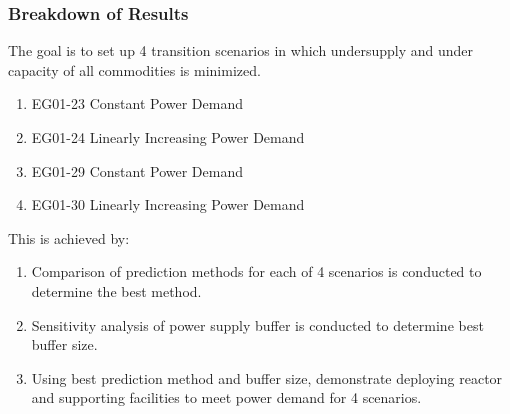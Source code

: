 \begin{frame}
    \frametitle{Breakdown of Results}
    The goal is to set up 4 transition scenarios in which undersupply 
    and under capacity of all commodities is minimized. 
    \begin{enumerate}
        \item EG01-23 Constant Power Demand
        \item EG01-24 Linearly Increasing Power Demand
        \item EG01-29 Constant Power Demand
        \item EG01-30 Linearly Increasing Power Demand
    \end{enumerate}

This is achieved by:
\begin{enumerate}
    \item Comparison of prediction methods for each of 4 scenarios is conducted 
    to determine the best method. 
    \item Sensitivity analysis of power supply buffer is conducted to determine 
    best buffer size. 
    \item Using best prediction method and buffer size, demonstrate \deploy 
    deploying reactor and supporting facilities to meet power demand 
    for 4 scenarios. 
\end{enumerate}

\end{frame}